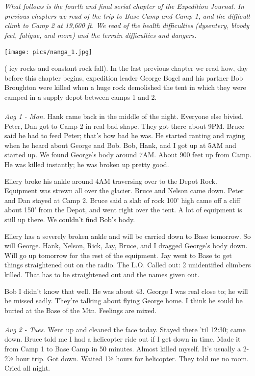 \documentclass[10pt,a4paper]{article}
\newenvironment{Figure}
  {\par\medskip\noindent\minipage{\linewidth}}
  {\endminipage\par\medskip}
\begin{document}
\begin{multicols}{2}
\textit{What  follows is the fourth and final serial chapter of the Expedition Journal.
In previous chapters we read of the trip to Base Camp and Camp 1, and the difficult climb to Camp 2 at 19,600 ft.  We read of the health difficulties (dysentery, bloody feet, fatigue, and more) and the terrain difficulties and dangers.
}

\begin{Figure}
 \centering
 \texttt{[image: pics/nanga\_1.jpg]}
\end{Figure}

 ( icy rocks and constant rock fall). In the last previous chapter we read how, day before this chapter begins, expedition leader George Bogel and his partner Bob Broughton were killed when a huge rock demolished the tent in which they were camped in a supply depot between camps 1 and 2.
\\
\\
\textit{Aug 1 - Mon.}
Hank came back in the middle of the night.  Everyone else bivied.  Peter, Dan got to Camp 2 in real bad shape.  They got there about 9PM.  Bruce said he had to feed Peter; that's how bad he was.  He started ranting and raging when he heard about George and Bob.  Bob, Hank, and I got up at 5AM and started up.  We found George's body around 7AM. About 900 feet up from Camp. He was killed instantly; he was broken up pretty good.

Ellery broke his ankle around 4AM traversing over to the Depot Rock.  Equipment was strewn all over the glacier.  Bruce and Nelson came down.  Peter and Dan stayed at Camp 2.  Bruce said a slab of rock 100' high came off a cliff about 150' from the Depot, and went right over the tent.  A lot of equipment is still up there.  We couldn't find Bob's body.  

Ellery has a severely broken ankle and will be carried down to Base tomorrow.  So will George.  Hank, Nelson, Rick, Jay, Bruce, and I dragged George's body down.  Will go up tomorrow for the rest of the equipment.  Jay went to Base to get things straightened out on the radio.  The L.O. Called out: 2 unidentified climbers killed.  That has to be straightened out and the names given out.

Bob I didn't know that well.  He was about 43.  George I was real close to; he will be missed sadly.  They're talking about flying George home.  I think he sould be buried at the Base of the Mtn.  Feelings are mixed.
\\
\\
\textit{Aug 2 - Tues.}
Went up and cleaned the face today.  Stayed there 'til 12:30; came down.  Bruce told me I had a helicopter ride out if I get down in time.  Made it from Camp 1 to Base Camp in 50 minutes. Almost killed myself.  It's usually a 2-2½ hour trip.  Got down.  Waited 1½ hours for helicopter.    They told me no room.  Cried all night. 


\end{multicols}
\end{document}
